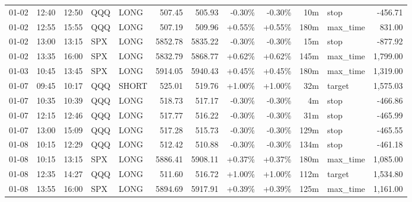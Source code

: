 \documentclass[11pt,a4paper]{article}
\begin{document}
\begin{center}
\begin{longtable}{>{\color{txtmain}}l l l l l r r r r r >{\color{txtmain}}l r}
01-02 & 12:40 & 12:50 & QQQ & LONG & 507.45 & 505.93 & \textcolor{lossred}{-0.30\%} & \textcolor{lossred}{-0.30\%} & 10m & stop & \textcolor{lossred}{-456.71} \\
01-02 & 12:55 & 15:55 & QQQ & LONG & 507.19 & 509.96 & \textcolor{wingreen}{+0.55\%} & \textcolor{wingreen}{+0.55\%} & 180m & max\_time & \textcolor{wingreen}{831.00} \\
01-02 & 13:00 & 13:15 & SPX & LONG & 5852.78 & 5835.22 & \textcolor{lossred}{-0.30\%} & \textcolor{lossred}{-0.30\%} & 15m & stop & \textcolor{lossred}{-877.92} \\
01-02 & 13:35 & 16:00 & SPX & LONG & 5832.79 & 5868.77 & \textcolor{wingreen}{+0.62\%} & \textcolor{wingreen}{+0.62\%} & 145m & max\_time & \textcolor{wingreen}{1,799.00} \\
01-03 & 10:45 & 13:45 & SPX & LONG & 5914.05 & 5940.43 & \textcolor{wingreen}{+0.45\%} & \textcolor{wingreen}{+0.45\%} & 180m & max\_time & \textcolor{wingreen}{1,319.00} \\
01-07 & 09:45 & 10:17 & QQQ & SHORT & 525.01 & 519.76 & \textcolor{wingreen}{+1.00\%} & \textcolor{wingreen}{+1.00\%} & 32m & target & \textcolor{wingreen}{1,575.03} \\
01-07 & 10:35 & 10:39 & QQQ & LONG & 518.73 & 517.17 & \textcolor{lossred}{-0.30\%} & \textcolor{lossred}{-0.30\%} & 4m & stop & \textcolor{lossred}{-466.86} \\
01-07 & 12:15 & 12:46 & QQQ & LONG & 517.77 & 516.22 & \textcolor{lossred}{-0.30\%} & \textcolor{lossred}{-0.30\%} & 31m & stop & \textcolor{lossred}{-465.99} \\
01-07 & 13:00 & 15:09 & QQQ & LONG & 517.28 & 515.73 & \textcolor{lossred}{-0.30\%} & \textcolor{lossred}{-0.30\%} & 129m & stop & \textcolor{lossred}{-465.55} \\
01-08 & 10:15 & 12:29 & QQQ & LONG & 512.42 & 510.88 & \textcolor{lossred}{-0.30\%} & \textcolor{lossred}{-0.30\%} & 134m & stop & \textcolor{lossred}{-461.18} \\
01-08 & 10:15 & 13:15 & SPX & LONG & 5886.41 & 5908.11 & \textcolor{wingreen}{+0.37\%} & \textcolor{wingreen}{+0.37\%} & 180m & max\_time & \textcolor{wingreen}{1,085.00} \\
01-08 & 12:35 & 14:27 & QQQ & LONG & 511.60 & 516.72 & \textcolor{wingreen}{+1.00\%} & \textcolor{wingreen}{+1.00\%} & 112m & target & \textcolor{wingreen}{1,534.80} \\
01-08 & 13:55 & 16:00 & SPX & LONG & 5894.69 & 5917.91 & \textcolor{wingreen}{+0.39\%} & \textcolor{wingreen}{+0.39\%} & 125m & max\_time & \textcolor{wingreen}{1,161.00} \\

\end{longtable}
\end{center}
\end{document}
